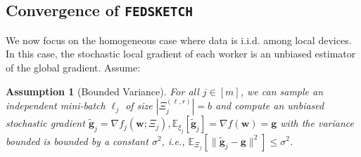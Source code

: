 \documentclass[twoside]{article}
\newtheorem{assumption}{Assumption}
\begin{document}
\subsection{Convergence of  \texttt{FEDSKETCH} } 
\vspace{-0.05in}
We now focus on the homogeneous case where data is i.i.d. among local devices. 
In this case, the stochastic local gradient of each worker is an unbiased estimator of the global gradient.
Assume:
\begin{assumption}[Bounded Variance]\label{Assu:1.5}
For all $j\in [m]$, we can sample an independent mini-batch $\ell_j$   of size $|\Xi_j^{(\ell,r)}| = b$ and compute an unbiased stochastic gradient  $\tilde{\mathbf{g}}_j = \nabla f_j(\boldsymbol{w}; \Xi_j), \mathbb{E}_{\xi_j}[\tilde{\mathbf{g}}_j] = \nabla f(\boldsymbol{w})=\mathbf{g}$ with  the variance bounded is bounded by a constant $\sigma^2$, i.e., $
\mathbb{E}_{\Xi_j}\left[\|\tilde{\mathbf{g}}_j-\mathbf{g}\|^2\right]\leq \sigma^2$.
\end{assumption}
\end{document}
